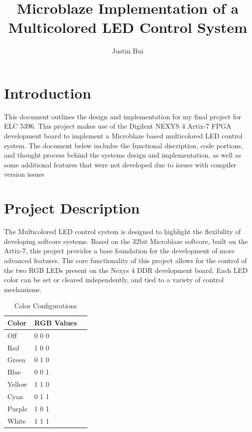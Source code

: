 \documentclass{article}
\author{Justin Bui}
\title{Microblaze Implementation of a Multicolored LED Control System}
\begin{document}
\maketitle
\newpage

\tableofcontents
\newpage

\section{Introduction}
This document outlines the design and implementation for my final project for ELC 5396. This project makes use of the Digilent NEXYS 4 Artix-7 FPGA development board to implement a Microblaze based multicolored LED control system. The document below includes the functional discription, code portions, and thought process behind the systems design and implementation, as well as some additional features that were not developed due to issues with compiler version issues 

\section{Project Description}
The Multicolored LED control system is designed to highlight the flexibility of developing softcore systems. Based on the 32bit Microblaze softcore, built on the Artix-7, this project provides a base foundation for the development of more advanced features. The core functionality of this project allows for the control of the two RGB LEDs present on the Nexys 4 DDR development board. Each LED color can be set or cleared independently, and tied to a variety of control mechanisms.


\begin{table}[h!]
	\begin{center}
		\caption{Color Configurations}
		\label{table:table1}
		\begin{tabular}{l l l}
			\textbf{Color} & \textbf{RGB Values} \\
			\hline
			Off  &  0 0 0 \\
			Red & 1 0 0 \\
			Green & 0 1 0 \\
			Blue & 0 0 1 \\
			Yellow & 1 1 0 \\
			Cyan & 0 1 1 \\
			Purple & 1 0 1 \\
			White & 1 1 1 
		\end{tabular}
	\end{center}
\end{table}
\end{document}
